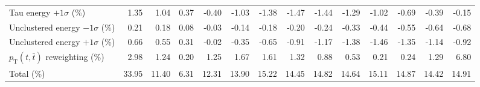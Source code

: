 \begin{table}[htbp]
{\begin{tabular}{lrrrrrrrrrrrrr}
Tau energy $+1\sigma$ (\%) & 1.35 & 1.04 & 0.37 & -0.40 & -1.03 & -1.38 & -1.47 & -1.44 & -1.29 & -1.02 & -0.69 & -0.39 & -0.15 \\ 
Unclustered energy $-1\sigma$ (\%) & 0.21 & 0.18 & 0.08 & -0.03 & -0.14 & -0.18 & -0.20 & -0.24 & -0.33 & -0.44 & -0.55 & -0.64 & -0.68 \\ 
Unclustered energy $+1\sigma$ (\%) & 0.66 & 0.55 & 0.31 & -0.02 & -0.35 & -0.65 & -0.91 & -1.17 & -1.38 & -1.46 & -1.35 & -1.14 & -0.92 \\ 
$p_\mathrm{T}(t,\bar{t})$ reweighting (\%) & 2.98 & 1.24 & 0.20 & 1.25 & 1.67 & 1.61 & 1.32 & 0.88 & 0.53 & 0.21 & 0.24 & 1.29 & 6.80 \\ 
\hline 
Total (\%) & 33.95  & 11.40  & 6.31  & 12.31  & 13.90  & 15.22  & 14.45  & 14.82  & 14.64  & 15.11  & 14.87  & 14.42  & 14.91 \\ 
\hline 
\end{tabular}
}
\end{table}
